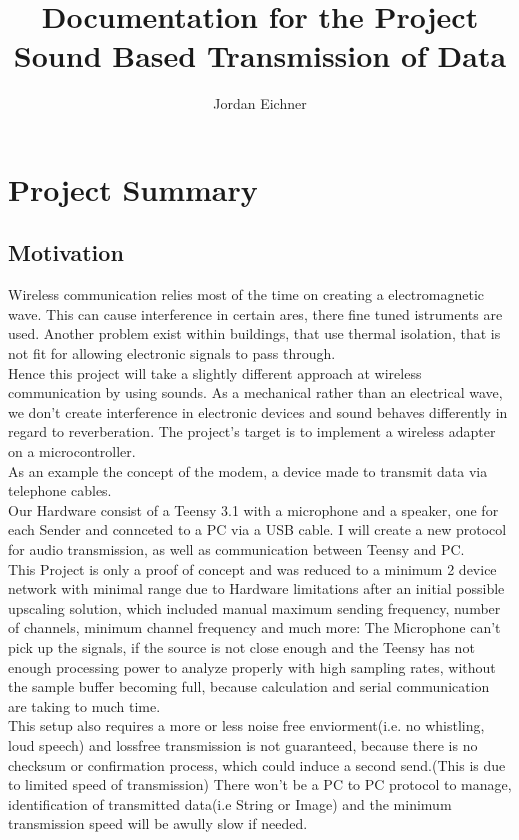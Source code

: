 \documentclass{book}
\title{Documentation for the Project Sound Based Transmission of Data}
\author{Jordan Eichner}
\begin{document}
\maketitle
\tableofcontents
\chapter{Project Summary}
\section{Motivation}
Wireless communication relies most of the time on creating a electromagnetic wave. This can cause interference in certain ares, there fine tuned istruments are used. Another problem exist within buildings, that use thermal isolation, that is not fit for allowing electronic signals to pass through.
\\ Hence this project will take a slightly different approach at wireless communication by using sounds. As a mechanical rather than an electrical wave, we don't create interference in electronic devices and sound behaves differently in regard to reverberation. The project's target is to implement a wireless adapter on a microcontroller.
\\As an example the concept of the modem, a device made to transmit data via telephone cables.
\\Our Hardware consist of a Teensy 3.1 with a microphone and a speaker, one for each Sender and connceted to a PC via a USB cable.
I will create a new protocol for audio transmission, as well as communication between Teensy and PC. 
\\This Project is only a proof of concept and was reduced to a minimum 2 device network with minimal range due to Hardware limitations after an initial possible upscaling solution, which included manual maximum sending frequency, number of channels, minimum channel frequency and much more: The Microphone can't pick up the signals, if the source is not close enough and the Teensy has not enough processing power to analyze properly with high sampling rates, without the sample buffer becoming full, because calculation and serial communication are taking to much time.
\\This setup also requires a more or less noise free enviorment(i.e. no whistling, loud speech) and lossfree transmission is not guaranteed, because there is no checksum or confirmation process, which could induce a second send.(This is due to limited speed of transmission) There won't be a PC to PC protocol to manage, identification of transmitted data(i.e String or Image) and the minimum transmission speed will be awully slow if needed.
\end{document}
